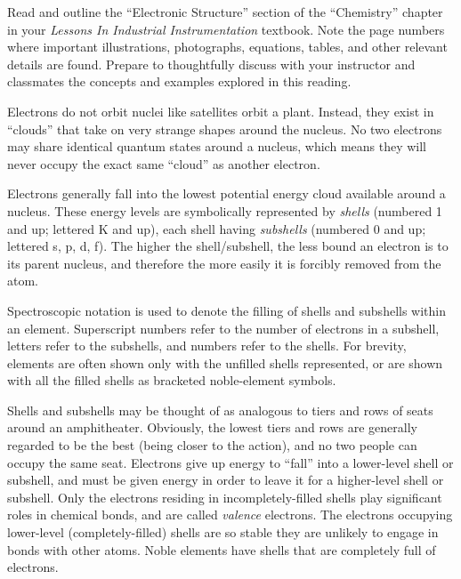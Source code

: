 
Read and outline the ``Electronic Structure'' section of the ``Chemistry'' chapter in your {\it Lessons In Industrial Instrumentation} textbook.  Note the page numbers where important illustrations, photographs, equations, tables, and other relevant details are found.  Prepare to thoughtfully discuss with your instructor and classmates the concepts and examples explored in this reading.













Electrons do not orbit nuclei like satellites orbit a plant.  Instead, they exist in ``clouds'' that take on very strange shapes around the nucleus.  No two electrons may share identical quantum states around a nucleus, which means they will never occupy the exact same ``cloud'' as another electron.

\vskip 10pt

Electrons generally fall into the lowest potential energy cloud available around a nucleus.  These energy levels are symbolically represented by {\it shells} (numbered 1 and up; lettered K and up), each shell having {\it subshells} (numbered 0 and up; lettered s, p, d, f).  The higher the shell/subshell, the less bound an electron is to its parent nucleus, and therefore the more easily it is forcibly removed from the atom.

\vskip 10pt

Spectroscopic notation is used to denote the filling of shells and subshells within an element.  Superscript numbers refer to the number of electrons in a subshell, letters refer to the subshells, and numbers refer to the shells.  For brevity, elements are often shown only with the unfilled shells represented, or are shown with all the filled shells as bracketed noble-element symbols.

\vskip 10pt

Shells and subshells may be thought of as analogous to tiers and rows of seats around an amphitheater.  Obviously, the lowest tiers and rows are generally regarded to be the best (being closer to the action), and no two people can occupy the same seat.  Electrons give up energy to ``fall'' into a lower-level shell or subshell, and must be given energy in order to leave it for a higher-level shell or subshell.  Only the electrons residing in incompletely-filled shells play significant roles in chemical bonds, and are called {\it valence} electrons.  The electrons occupying lower-level (completely-filled) shells are so stable they are unlikely to engage in bonds with other atoms.  Noble elements have shells that are completely full of electrons.

